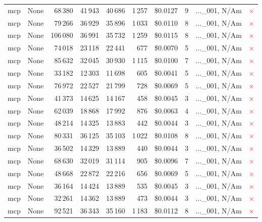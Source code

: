 \documentclass[a4paper,11pt]{article}
\begin{document}
\begin{table}[H]
{\begin{tabular}{l r r r r r r r l c}
mcp & None & 68\,380 & 41\,943 & 40\,686 & 1\,257 & \$0.0127 & 9 & ...\_001, N/Am & \textcolor{red}{\(\times\)} \\
mcp & None & 79\,266 & 36\,929 & 35\,896 & 1\,033 & \$0.0110 & 8 & ...\_001, N/Am & \textcolor{red}{\(\times\)} \\
mcp & None & 106\,080 & 36\,991 & 35\,732 & 1\,259 & \$0.0115 & 8 & ...\_001, N/Am & \textcolor{red}{\(\times\)} \\
mcp & None & 74\,018 & 23\,118 & 22\,441 & 677 & \$0.0070 & 5 & ...\_001, N/Am & \textcolor{red}{\(\times\)} \\
mcp & None & 85\,632 & 32\,045 & 30\,930 & 1\,115 & \$0.0100 & 7 & ...\_001, N/Am & \textcolor{red}{\(\times\)} \\
mcp & None & 33\,182 & 12\,303 & 11\,698 & 605 & \$0.0041 & 5 & ...\_001, N/Am & \textcolor{red}{\(\times\)} \\
mcp & None & 76\,972 & 22\,527 & 21\,799 & 728 & \$0.0069 & 5 & ...\_001, N/Am & \textcolor{red}{\(\times\)} \\
mcp & None & 41\,373 & 14\,625 & 14\,167 & 458 & \$0.0045 & 3 & ...\_001, N/Am & \textcolor{red}{\(\times\)} \\
mcp & None & 62\,039 & 18\,868 & 17\,992 & 876 & \$0.0063 & 4 & ...\_001, N/Am & \textcolor{red}{\(\times\)} \\
mcp & None & 48\,214 & 14\,325 & 13\,883 & 442 & \$0.0044 & 3 & ...\_001, N/Am & \textcolor{red}{\(\times\)} \\
mcp & None & 80\,331 & 36\,125 & 35\,103 & 1\,022 & \$0.0108 & 8 & ...\_001, N/Am & \textcolor{red}{\(\times\)} \\
mcp & None & 36\,502 & 14\,329 & 13\,889 & 440 & \$0.0044 & 3 & ...\_001, N/Am & \textcolor{red}{\(\times\)} \\
mcp & None & 68\,630 & 32\,019 & 31\,114 & 905 & \$0.0096 & 7 & ...\_001, N/Am & \textcolor{red}{\(\times\)} \\
mcp & None & 48\,668 & 22\,872 & 22\,216 & 656 & \$0.0069 & 5 & ...\_001, N/Am & \textcolor{red}{\(\times\)} \\
mcp & None & 36\,164 & 14\,424 & 13\,889 & 535 & \$0.0045 & 3 & ...\_001, N/Am & \textcolor{red}{\(\times\)} \\
mcp & None & 32\,261 & 14\,362 & 13\,889 & 473 & \$0.0044 & 3 & ...\_001, N/Am & \textcolor{red}{\(\times\)} \\
mcp & None & 92\,521 & 36\,343 & 35\,160 & 1\,183 & \$0.0112 & 8 & ...\_001, N/Am & \textcolor{red}{\(\times\)} \\

\end{tabular}}
\end{table}
\end{document}
